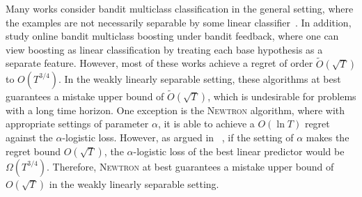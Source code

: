 

Many works consider bandit multiclass classification in the general setting,
where the examples are not necessarily separable by some linear
classifier~\cite{Abernethy-Rakhlin-2009, Wang-Jin-Valizadegan-2010,
Crammer-Gentile-2013, Hazan-Kale-2011, Beygelzimer-Orabona-Zhang-2017,
Foster-Kale-Luo-Mohri-Sridharan-2018}. In addition, \citet{Chen-Lin-Lu-2014,
Zhang-Jung-Tewari-2018} study online bandit multiclass boosting under bandit
feedback, where one can view boosting as linear classification by treating each
base hypothesis as a separate feature. However, most of these works achieve a
regret of order $\widetilde{O}(\sqrt{T})$ to $O(T^{3/4})$. In the weakly
linearly separable setting, these algorithms at best guarantees a mistake upper
bound of $\widetilde{O}(\sqrt{T})$, which is undesirable for problems with a
long time horizon. One exception is the \textsc{Newtron} algorithm, where with
appropriate settings of parameter $\alpha$, it is able to achieve a $O(\ln T)$
regret against the $\alpha$-logistic loss. However, as argued in
~\citep[][Appendix D]{Beygelzimer-Orabona-Zhang-2017}, if the setting of
$\alpha$ makes the regret bound $O(\sqrt{T})$, the $\alpha$-logistic loss of the
best linear predictor would be $\Omega(T^{3/4})$. Therefore, \textsc{Newtron} at
best guarantees a mistake upper bound of $O(\sqrt{T})$ in the weakly linearly
separable setting.


